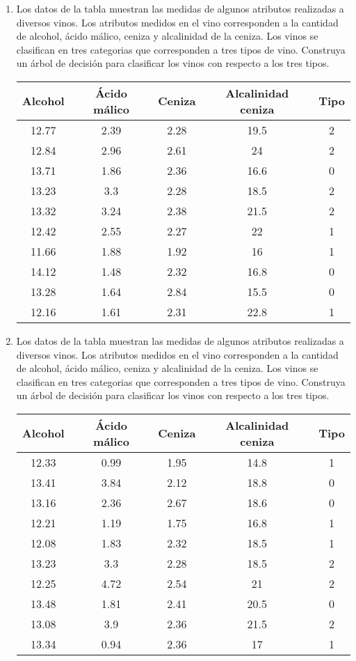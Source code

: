 \documentclass[
10pt, %
a4paper, %
]{article}
\begin{document}
\begin{enumerate}
    \item Los datos de la tabla muestran las medidas de algunos atributos realizadas a diversos vinos. Los atributos
	medidos en el vino corresponden a la cantidad de alcohol, ácido málico, ceniza y alcalinidad de la ceniza. 
	Los vinos se clasifican en tres categorias que corresponden a tres tipos de vino. Construya un árbol de decisión 
	para clasificar los vinos con respecto a los tres tipos.
	\begin{table}[H]
		\centering
		\begin{tabular}{ccccc}
			\toprule
			Alcohol & Ácido málico & Ceniza & Alcalinidad ceniza & Tipo \\ \midrule
			12.77 & 2.39 & 2.28 & 19.5 & 2 \\
			12.84 & 2.96 & 2.61 & 24   & 2 \\
			13.71 & 1.86 & 2.36 & 16.6 & 0 \\
			13.23 & 3.3  & 2.28 & 18.5 & 2 \\
			13.32 & 3.24 & 2.38 & 21.5 & 2 \\
			12.42 & 2.55 & 2.27 & 22   & 1 \\
			11.66 & 1.88 & 1.92 & 16   & 1 \\
			14.12 & 1.48 & 2.32 & 16.8 & 0 \\
			13.28 & 1.64 & 2.84 & 15.5 & 0 \\
			12.16 & 1.61 & 2.31 & 22.8 & 1\\
			\bottomrule
		\end{tabular}
	\end{table}

    \item Los datos de la tabla muestran las medidas de algunos atributos realizadas a diversos vinos. Los atributos
	medidos en el vino corresponden a la cantidad de alcohol, ácido málico, ceniza y alcalinidad de la ceniza. 
	Los vinos se clasifican en tres categorias que corresponden a tres tipos de vino. Construya un árbol de decisión 
	para clasificar los vinos con respecto a los tres tipos.
	\begin{table}[H]
		\centering
		\begin{tabular}{ccccc}
			\toprule
			Alcohol & Ácido málico & Ceniza & Alcalinidad ceniza & Tipo \\ \midrule
			12.33 & 0.99 & 1.95 & 14.8 & 1 \\
			13.41 & 3.84 & 2.12 & 18.8 & 0 \\
			13.16 & 2.36 & 2.67 & 18.6 & 0 \\
			12.21 & 1.19 & 1.75 & 16.8 & 1 \\
			12.08 & 1.83 & 2.32 & 18.5 & 1 \\
			13.23 & 3.3  & 2.28 & 18.5 & 2 \\
			12.25 & 4.72 & 2.54 & 21   & 2 \\
			13.48 & 1.81 & 2.41 & 20.5 & 0 \\
			13.08 & 3.9  & 2.36 & 21.5 & 2 \\ 
			13.34 & 0.94 & 2.36 & 17   & 1 \\
			\bottomrule
		\end{tabular}
	\end{table}
\end{enumerate}
\end{document}
